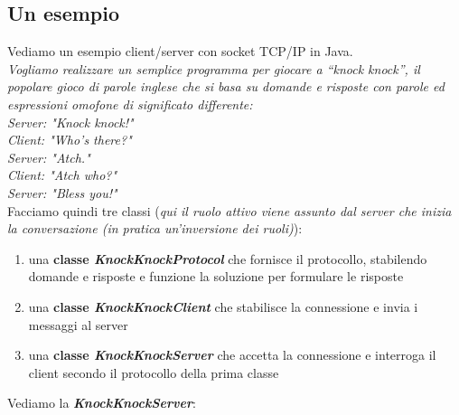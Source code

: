 \documentclass[a4paper,12pt, oneside]{book}
\begin{document}
\subsection{Un esempio}
Vediamo un esempio client/server con socket TCP/IP in Java.\\
\textit{Vogliamo realizzare un semplice programma per giocare a “knock knock”, il popolare gioco di parole inglese che si basa su domande e risposte con parole ed espressioni omofone di significato differente:}\\
\textit{Server: "Knock knock!"\\
Client: "Who's there?"\\
Server: "Atch."\\
Client: "Atch who?"\\
Server: "Bless you!"}
\\
Facciamo quindi tre classi (\textit{qui il ruolo attivo viene assunto dal server che inizia la
conversazione (in pratica un'inversione dei ruoli)}):
\begin{enumerate}
\item una \textbf{classe \textit{KnockKnockProtocol}} che fornisce il protocollo, stabilendo domande e risposte e funzione la soluzione per formulare le risposte
\item una \textbf{classe \textit{KnockKnockClient}} che stabilisce la connessione e invia i messaggi al server
\item una \textbf{classe \textit{KnockKnockServer}} che accetta la connessione e interroga il client secondo il protocollo della prima classe 
\end{enumerate}
\newpage
Vediamo la \textbf{\textit{KnockKnockServer}}:
\end{document}
